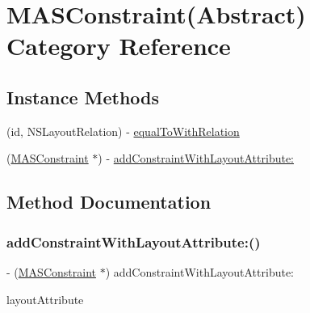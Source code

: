 \hypertarget{category_m_a_s_constraint_07_abstract_08}{}\section{M\+A\+S\+Constraint(Abstract) Category Reference}
\label{category_m_a_s_constraint_07_abstract_08}
\subsection*{Instance Methods}
\begin{DoxyCompactItemize}
\item 
(id, N\+S\+Layout\+Relation) -\/ \mbox{\hyperlink{category_m_a_s_constraint_07_abstract_08_a06df7a7cb2a7c3e32197800487d8d927}{equal\+To\+With\+Relation}}
\item 
(\mbox{\hyperlink{interface_m_a_s_constraint}{M\+A\+S\+Constraint}} $\ast$) -\/ \mbox{\hyperlink{category_m_a_s_constraint_07_abstract_08_a432981551ebd6025204a33e5e4676c97}{add\+Constraint\+With\+Layout\+Attribute\+:}}
\end{DoxyCompactItemize}


\subsection{Method Documentation}
\mbox{\label{category_m_a_s_constraint_07_abstract_08_a432981551ebd6025204a33e5e4676c97}} 
\subsubsection{\texorpdfstring{add\+Constraint\+With\+Layout\+Attribute\+:()}{addConstraintWithLayoutAttribute:()}}
{\footnotesize\ttfamily -\/ (\mbox{\hyperlink{interface_m_a_s_constraint}{M\+A\+S\+Constraint}} $\ast$) add\+Constraint\+With\+Layout\+Attribute\+: \begin{DoxyParamCaption}\item[{(N\+S\+Layout\+Attribute)}]{layout\+Attribute }\end{DoxyParamCaption}}

